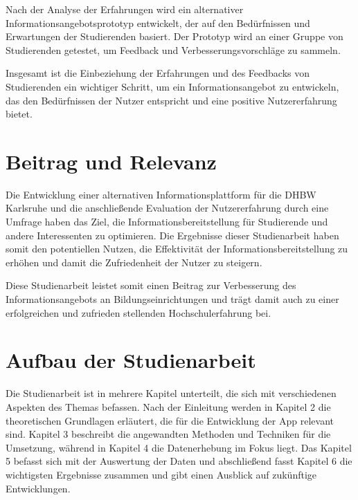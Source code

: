 Nach der Analyse der Erfahrungen wird ein alternativer Informationsangebotsprototyp entwickelt, der auf den Bedürfnissen und Erwartungen der Studierenden basiert. Der Prototyp wird an einer Gruppe von Studierenden getestet, um Feedback und Verbesserungsvorschläge zu sammeln.

Insgesamt ist die Einbeziehung der Erfahrungen und des Feedbacks von Studierenden ein wichtiger Schritt, um ein Informationsangebot zu entwickeln, das den Bedürfnissen der Nutzer entspricht und eine positive Nutzererfahrung bietet.


\section{Beitrag und Relevanz}
Die Entwicklung einer alternativen Informationsplattform für die DHBW Karlsruhe und die anschließende Evaluation der Nutzererfahrung durch eine Umfrage haben das Ziel, die Informationsbereitstellung für Studierende und andere Interessenten zu optimieren. Die Ergebnisse dieser Studienarbeit haben somit den potentiellen Nutzen, die Effektivität der Informationsbereitstellung zu erhöhen und damit die Zufriedenheit der Nutzer zu steigern.

Diese Studienarbeit leistet somit einen Beitrag zur Verbesserung des Informationsangebots an Bildungseinrichtungen und trägt damit auch zu einer erfolgreichen und zufrieden stellenden Hochschulerfahrung bei.
\newpage

\section{Aufbau der Studienarbeit}
Die Studienarbeit ist in mehrere Kapitel unterteilt, die sich mit verschiedenen Aspekten des Themas befassen. Nach der Einleitung werden in Kapitel 2 die theoretischen Grundlagen erläutert, die für die Entwicklung der App relevant sind. Kapitel 3 beschreibt die angewandten Methoden und Techniken für die Umsetzung, während in Kapitel 4 die Datenerhebung im Fokus liegt. Das Kapitel 5 befasst sich mit der Auswertung der Daten und abschließend fasst Kapitel 6 die wichtigsten Ergebnisse zusammen und gibt einen Ausblick auf zukünftige Entwicklungen.
